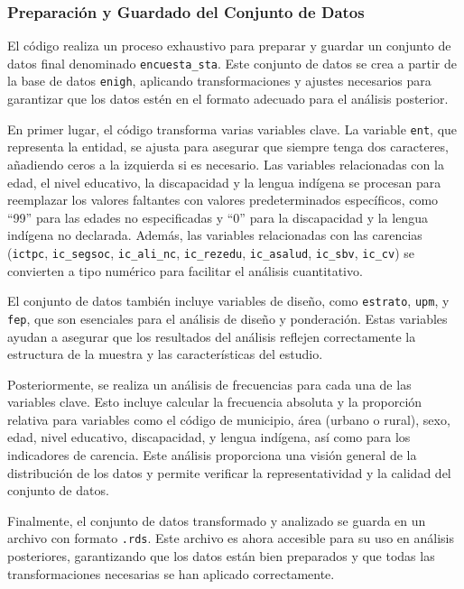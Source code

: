 \documentclass[
  12pt,
]{book}
\begin{document}
\hypertarget{preparaciuxf3n-y-guardado-del-conjunto-de-datos}{%
\subsubsection*{Preparación y Guardado del Conjunto de Datos}\label{preparaciuxf3n-y-guardado-del-conjunto-de-datos}}

El código realiza un proceso exhaustivo para preparar y guardar un conjunto de datos final denominado \texttt{encuesta\_sta}. Este conjunto de datos se crea a partir de la base de datos \texttt{enigh}, aplicando transformaciones y ajustes necesarios para garantizar que los datos estén en el formato adecuado para el análisis posterior.

En primer lugar, el código transforma varias variables clave. La variable \texttt{ent}, que representa la entidad, se ajusta para asegurar que siempre tenga dos caracteres, añadiendo ceros a la izquierda si es necesario. Las variables relacionadas con la edad, el nivel educativo, la discapacidad y la lengua indígena se procesan para reemplazar los valores faltantes con valores predeterminados específicos, como ``99'' para las edades no especificadas y ``0'' para la discapacidad y la lengua indígena no declarada. Además, las variables relacionadas con las carencias (\texttt{ictpc}, \texttt{ic\_segsoc}, \texttt{ic\_ali\_nc}, \texttt{ic\_rezedu}, \texttt{ic\_asalud}, \texttt{ic\_sbv}, \texttt{ic\_cv}) se convierten a tipo numérico para facilitar el análisis cuantitativo.

El conjunto de datos también incluye variables de diseño, como \texttt{estrato}, \texttt{upm}, y \texttt{fep}, que son esenciales para el análisis de diseño y ponderación. Estas variables ayudan a asegurar que los resultados del análisis reflejen correctamente la estructura de la muestra y las características del estudio.

Posteriormente, se realiza un análisis de frecuencias para cada una de las variables clave. Esto incluye calcular la frecuencia absoluta y la proporción relativa para variables como el código de municipio, área (urbano o rural), sexo, edad, nivel educativo, discapacidad, y lengua indígena, así como para los indicadores de carencia. Este análisis proporciona una visión general de la distribución de los datos y permite verificar la representatividad y la calidad del conjunto de datos.

Finalmente, el conjunto de datos transformado y analizado se guarda en un archivo con formato \texttt{.rds}. Este archivo es ahora accesible para su uso en análisis posteriores, garantizando que los datos están bien preparados y que todas las transformaciones necesarias se han aplicado correctamente.
\end{document}
